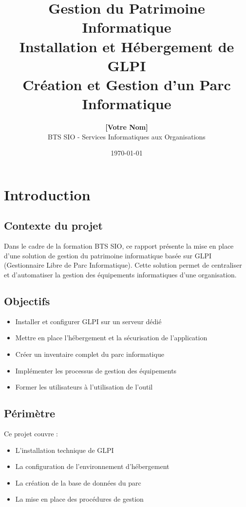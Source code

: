 \documentclass[12pt,a4paper]{article}
\title{
    \LARGE{\textbf{Gestion du Patrimoine Informatique}} \\
    \Large{Installation et Hébergement de GLPI} \\
    \Large{Création et Gestion d'un Parc Informatique}
}
\author{
    \textbf{[Votre Nom]} \\
    BTS SIO - Services Informatiques aux Organisations
}
\date{\today}
\begin{document}
\maketitle
\thispagestyle{empty}

\newpage
\tableofcontents
\newpage

\section{Introduction}

\subsection{Contexte du projet}
Dans le cadre de la formation BTS SIO, ce rapport présente la mise en place d'une solution de gestion du patrimoine informatique basée sur GLPI (Gestionnaire Libre de Parc Informatique). Cette solution permet de centraliser et d'automatiser la gestion des équipements informatiques d'une organisation.

\subsection{Objectifs}
\begin{itemize}
    \item Installer et configurer GLPI sur un serveur dédié
    \item Mettre en place l'hébergement et la sécurisation de l'application
    \item Créer un inventaire complet du parc informatique
    \item Implémenter les processus de gestion des équipements
    \item Former les utilisateurs à l'utilisation de l'outil
\end{itemize}

\subsection{Périmètre}
Ce projet couvre :
\begin{itemize}
    \item L'installation technique de GLPI
    \item La configuration de l'environnement d'hébergement
    \item La création de la base de données du parc
    \item La mise en place des procédures de gestion
\end{itemize}
\end{document}
